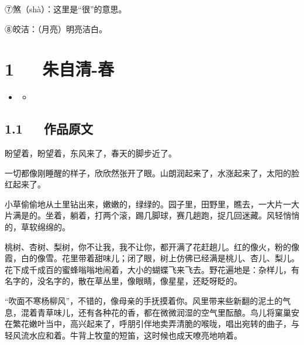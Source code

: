 \documentclass[letterpaper,12pt,english]{sphinxmanual}
\begin{document}
⑦煞（shà）：这里是“很”的意思。

⑧皎洁：（月亮）明亮洁白。


\chapter{1   朱自清-春}
\label{\detokenize{p01_u6563_u6587/_u6731_u81ea_u6e05-_u6625:id1}}\label{\detokenize{p01_u6563_u6587/_u6731_u81ea_u6e05-_u6625::doc}}
\begin{sphinxShadowBox}
\begin{itemize}
\item {} 
\label{\detokenize{p01_u6563_u6587/_u6731_u81ea_u6e05-_u6625:id4}}{\hyperref[\detokenize{p01_u6563_u6587/_u6731_u81ea_u6e05-_u6625:id1}]{}}
\begin{itemize}
\item {} 
\label{\detokenize{p01_u6563_u6587/_u6731_u81ea_u6e05-_u6625:id5}}{\hyperref[\detokenize{p01_u6563_u6587/_u6731_u81ea_u6e05-_u6625:id3}]{}}

\end{itemize}

\end{itemize}
\end{sphinxShadowBox}


\section{1.1   作品原文}
\label{\detokenize{p01_u6563_u6587/_u6731_u81ea_u6e05-_u6625:id3}}
盼望着，盼望着，东风来了，春天的脚步近了。

一切都像刚睡醒的样子，欣欣然张开了眼。山朗润起来了，水涨起来了，太阳的脸红起来了。

小草偷偷地从土里钻出来，嫩嫩的，绿绿的。园子里，田野里，瞧去，一大片一大片满是的。坐着，躺着，打两个滚，踢几脚球，赛几趟跑，捉几回迷藏。风轻悄悄的，草软绵绵的。

桃树、杏树、梨树，你不让我，我不让你，都开满了花赶趟儿。红的像火，粉的像霞，白的像雪。花里带着甜味儿；闭了眼，树上仿佛已经满是桃儿、杏儿、梨儿。花下成千成百的蜜蜂嗡嗡地闹着，大小的蝴蝶飞来飞去。野花遍地是：杂样儿，有名字的，没名字的，散在草丛里，像眼睛，像星星，还眨呀眨的。

“吹面不寒杨柳风”，不错的，像母亲的手抚摸着你。风里带来些新翻的泥土的气息，混着青草味儿，还有各种花的香，都在微微润湿的空气里酝酿。鸟儿将窠巢安在繁花嫩叶当中，高兴起来了，呼朋引伴地卖弄清脆的喉咙，唱出宛转的曲子，与轻风流水应和着。牛背上牧童的短笛，这时候也成天嘹亮地响着。
\end{document}
